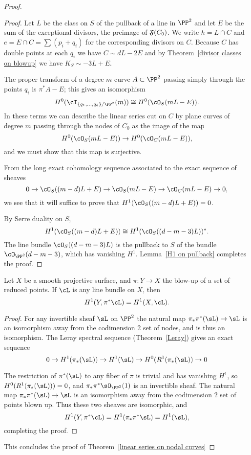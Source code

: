 \begin{proof}
\begin{proof}
Let $L$ be the class on $S$ of the pullback of a line in $\PP^2$  and let $E$ be the sum of the exceptional divisors, the preimage of $\adj(C_{0})$. We write $h= L\cap C$ and $e = E\cap C= \sum (p_i+q_i)$ for the corresponding divisors on $C$. 
Because $C$ has double points at each $q_{i}$ we have
$
C \sim dL - 2E 
$
and   by
Theorem~\ref{divisor classes on blowup} we have $K_S \sim -3L + E$.

The proper transform of a degree $m$ curve $A\subset \PP^2$  passing simply through the points $q_i$
is $\pi^*A - E$; this gives an isomorphism
$$
H^0(\cI_{\{q_1,\dots,q_\delta\}/\PP^2}(m)) \cong H^0(\cO_S(mL-E)).
$$
In these terms we can describe the linear series cut on $C$ by plane curves of degree $m$ passing through the nodes of $C_0$ as the image of the map
$$
H^0(\cO_S(mL-E)) \to H^0(\cO_C(mL-E)),
$$
and we must show that this map is surjective.

From the long exact cohomology sequence associated to the exact sequence of sheaves
$$
0 \to \cO_S((m-d)L + E)  \to \cO_S(mL-E) \to \cO_C(mL-E) \to 0,
$$
 we see that it will suffice to prove that $H^1(\cO_S((m-d)L + E)) = 0$. 
 
By Serre duality on $S$,
$$
H^1(\cO_S((m-d)L + E)) \cong H^1(\cO_S((d-m-3)L))^*.
$$
The line bundle $\cO_S((d-m-3)L)$ is 
 the pullback to $S$ of the bundle $\cO_{\PP^2}(d-m-3)$, which has vanishing $H^1$. Lemma~\ref{H1 on pullback} completes the proof.
\end{proof}

\begin{lemma}\label{H1 on pullback}
Let $X$ be a smooth projective surface, and $\pi : Y \to X$ the blow-up of a set of reduced points. If $\cL$ is any line bundle on $X$, then
$$
H^1(Y, \pi^*\cL) = H^1(X, \cL).
$$
\end{lemma}
\begin{proof}
For any invertible sheaf $\sL$ on $\PP^{2}$ the natural map $\pi_{*}\pi^{*}(\sL) \to \sL$ is an isomorphism
away from the codimension 2 set of nodes, and is thus an isomorphism. The Leray spectral sequence (Theorem~\ref{Leray}) gives an exact sequence
$$
0\to H^{1}(\pi_{*}(\sL)) \to H^{1}(\sL) \to  H^{0}(R^{1}(\pi_{*}(\sL))\to 0
$$

 The restriction of $\pi^{*}(\sL)$ to any fiber of $\pi$ is trivial and has vanishing $H^{1}$,
so
$H^{0}(R^{1}(\pi_{*}(\sL))) = 0$, and $\pi_{*}\pi^{*}\sO_{\PP^{2}}(1)$ is an invertible sheaf.
The natural map
$\pi_{*}\pi^{*}(\sL) \to \sL$ is an isomorphism away from the codimension
2 set of points blown up. Thus these two sheaves are isomorphic, and
$$
H^1(Y, \pi^*\cL) = H^{1}(\pi_{*}\pi^{*}\sL) = H^{1}(\sL),
$$
completing the proof.
\end{proof}

This concludes the proof of Theorem~\ref{linear series on nodal curves}
\end{proof}



